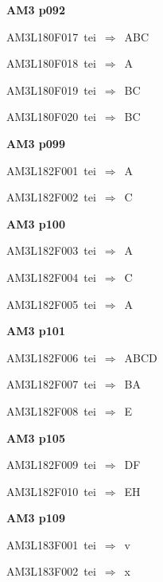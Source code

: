\par\vfill\eject
{\bf\hfill AM3 p092\hfill\hbox{}}\par\bigskip
{\sixrm AM3L180F017\ {\sixit tei}\ }$\Rightarrow$\ ABC\par\smallskip
{\sixrm AM3L180F018\ {\sixit tei}\ }$\Rightarrow$\ A\par\smallskip
{\sixrm AM3L180F019\ {\sixit tei}\ }$\Rightarrow$\ BC\par\smallskip
{\sixrm AM3L180F020\ {\sixit tei}\ }$\Rightarrow$\ BC\par\smallskip

\par\vfill\eject
{\bf\hfill AM3 p099\hfill\hbox{}}\par\bigskip
{\sixrm AM3L182F001\ {\sixit tei}\ }$\Rightarrow$\ A\par\smallskip
{\sixrm AM3L182F002\ {\sixit tei}\ }$\Rightarrow$\ C\par\smallskip

\par\vfill\eject
{\bf\hfill AM3 p100\hfill\hbox{}}\par\bigskip
{\sixrm AM3L182F003\ {\sixit tei}\ }$\Rightarrow$\ A\par\smallskip
{\sixrm AM3L182F004\ {\sixit tei}\ }$\Rightarrow$\ C\par\smallskip
{\sixrm AM3L182F005\ {\sixit tei}\ }$\Rightarrow$\ A\par\smallskip

\par\vfill\eject
{\bf\hfill AM3 p101\hfill\hbox{}}\par\bigskip
{\sixrm AM3L182F006\ {\sixit tei}\ }$\Rightarrow$\ ABCD\par\smallskip
{\sixrm AM3L182F007\ {\sixit tei}\ }$\Rightarrow$\ BA\par\smallskip
{\sixrm AM3L182F008\ {\sixit tei}\ }$\Rightarrow$\ E\par\smallskip

\par\vfill\eject
{\bf\hfill AM3 p105\hfill\hbox{}}\par\bigskip
{\sixrm AM3L182F009\ {\sixit tei}\ }$\Rightarrow$\ DF\par\smallskip
{\sixrm AM3L182F010\ {\sixit tei}\ }$\Rightarrow$\ EH\par\smallskip

\par\vfill\eject
{\bf\hfill AM3 p109\hfill\hbox{}}\par\bigskip
{\sixrm AM3L183F001\ {\sixit tei}\ }$\Rightarrow$\ {\tenit v}\par\smallskip
{\sixrm AM3L183F002\ {\sixit tei}\ }$\Rightarrow$\ {\tenit x}\par\smallskip

